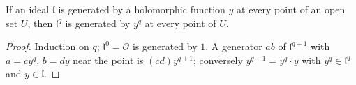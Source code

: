 \begin{lemma}
\label{mc:principal-power}
\leanok
If an ideal \(\mathfrak l\) is generated by a holomorphic function \(y\) at every point of an open set \(U\), then \(\mathfrak l^q\) is
generated by \(y^q\) at every point of \(U\).
\end{lemma}
\begin{proof}
\leanok
Induction on \(q\); \(\mathfrak l^0=\mathcal O\) is generated by \(1\). A generator \(ab\) of \(\mathfrak l^{q+1}\) with \(a=cy^q\), \(b=dy\) near
the point is \((cd)y^{q+1}\); conversely \(y^{q+1}=y^q\cdot y\) with \(y^q\in\mathfrak l^q\) and \(y\in\mathfrak l\).
\end{proof}


